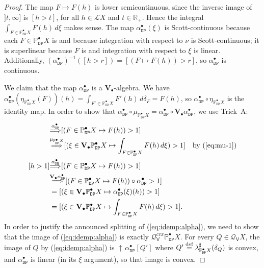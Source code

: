 \documentclass[preprint,12pt]{elsarticle}
\newcommand\eqdef{\mathrel{\buildrel \text{def}\over=}}
\newcommand{\Rp}{\mathbb{R}_+}
\DeclareMathOperator{\upc}{\uparrow\!}
\newcommand\Lform{\mathcal L}
\newcommand\Pred{\mathbb{P}}
\newcommand\Demon{{\mathtt{D}}}
\newcommand\Nature{{\mathtt{P}}}
\newcommand\DN{{\Demon\Nature}}
\newcommand\invto[1]{{\buildrel {#1} \over\Longrightarrow}}
\newcommand\Smyth{{\mathcal Q}}
\newcommand\Vt{\mathsf{V}}
\newcommand\SV{\Smyth_{\Vt}}
\newcommand\Val{{\mathbf V}}
\begin{document}
\begin{proof}
  The map $F \mapsto F (h)$ is lower semicontinuous, since the inverse
  image of $]t, \infty]$ is $[h > t]$, for all $h \in \Lform X$ and
  $t \in \Rp$.  Hence the integral
  $\int_{F \in \Pred_\DN^\bullet X} F (h) \,d\xi$ makes sense.  The
  map ${\alpha_\DN^\bullet} (\xi)$ is Scott-continuous because each
  $F \in \Pred_\DN^\bullet X$ is and because integration with respect
  to $\nu$ is Scott-continuous; it is superlinear because $F$ is and
  integration with respect to $\xi$ is linear.  Additionally,
  ${(\alpha_\DN^\bullet)}^{-1} ([h > r]) = [(F \mapsto F (h)) > r]$,
  so ${\alpha_\DN^\bullet}$ is continuous.

  We claim that the map $\alpha_\DN^\bullet$ is a
  $\Val_\bullet$-algebra.  We have
  $\alpha_\DN^\bullet (\eta_{\Pred_\DN^\bullet X} (F)) (h) = \int_{F'
    \in \Pred_\DN^\bullet X} F' (h)\,d\delta_F = F (h)$, so
  $\alpha_\DN^\bullet \circ \eta_{\Pred_\DN^\bullet X}$ is the
  identity map.  In order to show that
  $\alpha_\DN^\bullet \circ \mu_{\Pred_\DN^\bullet X} =
  \alpha_\DN^\bullet \circ \Val_\bullet {\alpha_\DN^\bullet}$, we use
  Trick~A:
  \begin{align*}
    [h > 1]
    & \invto{\alpha_\DN^\bullet}
      [(F \in \Pred_\DN^\bullet X \mapsto F (h)) > 1] \\
    & \invto{\mu_{\Pred_\DN^\bullet X}}
      [(\xi \in \Val_\bullet {\Pred_\DN^\bullet X} \mapsto
      \int_{F \in \Pred_\DN^\bullet X} F (h) \,d\xi) > 1]
    & \text{by (\ref{eq:mu-1})} \\
    [h > 1]
    & \invto{\alpha_\DN^\bullet}
      [(F \in \Pred_\DN^\bullet X \mapsto F (h)) > 1] \\
    & \invto{\Val_\bullet {\alpha_\DN^\bullet}}
      [(F \in \Pred_\DN^\bullet X \mapsto F (h)) \circ
      \alpha_\DN^\bullet > 1] \\
    & = [(\xi \in \Val_\bullet {\Pred_\DN^\bullet X} \mapsto
      \alpha_\DN^\bullet (\xi) (h)) > 1] \\
    & = [(\xi \in \Val_\bullet {\Pred_\DN^\bullet X} \mapsto
      \int_{F \in \Pred_\DN^\bullet X} F (h) \,d\xi) > 1].
  \end{align*}
  In order to justify the announced splitting of
  (\ref{eq:idemp:alpha}), we need to show that the image of
  (\ref{eq:idemp:alpha}) is exactly $\SV^{cvx} {\Pred_\DN^\bullet X}$.
  For every $Q \in \SV X$, the image of $Q$ by (\ref{eq:idemp:alpha})
  is $\upc \alpha_\DN^\bullet [Q']$ where
  $Q' \eqdef \lambda^\sharp_{\Pred_\DN^\bullet X} (\delta_Q)$ is
  convex, and $\alpha_\DN^\bullet$ is linear (in its $\xi$ argument),
  so that image is convex.


\end{proof}
\end{document}
